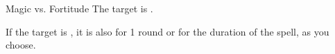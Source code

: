 \begin{spellheader}
    \spellrng{\rngmed}
    \begin{spelltargetinginfo}
    \end{spelltargetinginfo}
    \begin{spelleffects}
    \end{spelleffects}
\end{spellheader}
\begin{spellcontent}
    \begin{spellattack}{Magic vs. Fortitude}
        \spellsuccess The target is \sickened.

        If the target is \bloodied, it is also \blinded for 1 round or \deafened for the duration of the spell, as you choose.
    \end{spellattack}
    \spelldur{\durshort \dismissable}
\end{spellcontent}
\begin{spellfooter}

\end{spellfooter}

